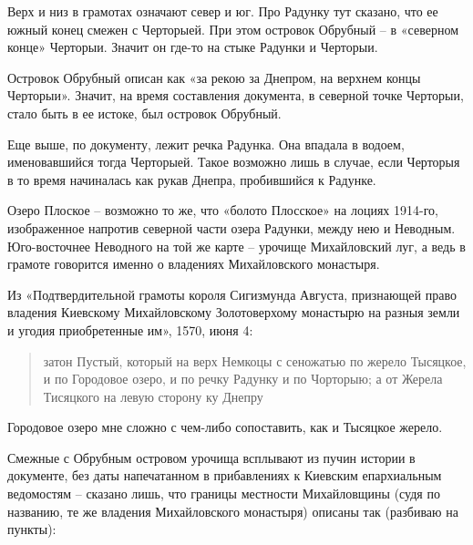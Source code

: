 Верх и низ в грамотах означают север и юг. Про Радунку тут сказано, что ее южный конец смежен с Черторыей. При этом островок Обрубный – в «северном конце» Черторыи. Значит он где-то на стыке Радунки и Черторыи.

Островок Обрубный описан как «за рекою за Днепром, на верхнем концы Черторыи». Значит, на время составления документа, в северной точке Черторыи, стало быть в ее истоке, был островок Обрубный.

Еще выше, по документу, лежит речка Радунка. Она впадала в водоем, именовавшийся тогда Черторыей. Такое возможно лишь в случае, если Черторыя в то время начиналась как рукав Днепра, пробившийся к Радунке.

Озеро Плоское – возможно то же, что «болото Плосское» на лоциях 1914-го, изображенное напротив северной части озера Радунки, между нею и Неводным. Юго-восточнее Неводного на той же карте – урочище Михайловский луг, а ведь в грамоте говорится именно о владениях Михайловского монастыря.

Из «Подтвердительной грамоты короля Сигизмунда Августа, признающей право владения Киевскому Михайловскому Золотоверхому монастырю на разныя земли и угодия приобретенные им», 1570, июня 4:

\begin{quotation}
затон Пустый, который на верх Немкоцы с сеножатью по жерело Тысяцкое, и по Городовое озеро, и по речку Радунку и по Чорторыю; а от Жерела Тисяцкого на левую сторону ку Днепру
\end{quotation}

Городовое озеро мне сложно с чем-либо сопоставить, как и Тысяцкое жерело.



Смежные с Обрубным островом урочища всплывают из пучин истории в документе, без даты напечатанном в прибавлениях к Киевским епархиальным ведомостям\cite{kieparhprib01} – сказано лишь, что границы местности Михайловщины (судя по названию, те же владения Михайловского монастыря) описаны так (разбиваю на пункты):

